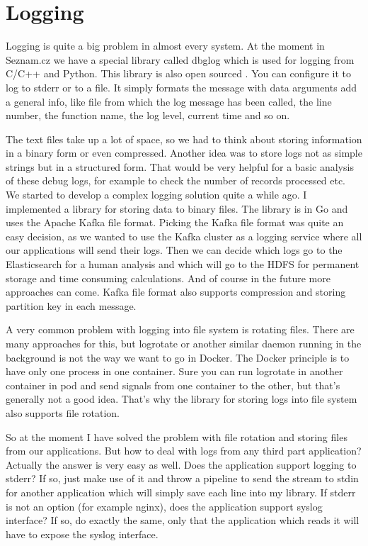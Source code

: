 \chapter{Logging}

Logging is quite a big problem in almost every system. At the moment in Seznam.cz we have a special library called dbglog which is used for logging from C/C++ and Python. This library is also open sourced \cite{dbglog}. You can configure it to log to stderr or to a file. It simply formats the message with data arguments add a general info, like file from which the log message has been called, the line number, the function name, the log level, current time and so on.

The text files take up a lot of space, so we had to think about storing information in a binary form or even compressed. Another idea was to store logs not as simple strings but in a structured form. That would be very helpful for a basic analysis of these debug logs, for example to check the number of records processed etc. We started to develop a complex logging solution quite a while ago. I implemented a library for storing data to binary files. The library is in Go and uses the Apache Kafka \cite{kafka} file format. Picking the Kafka file format was quite an easy decision, as we wanted to use the Kafka cluster as a logging service where all our applications will send their logs. Then we can decide which logs go to the Elasticsearch \cite{elasticsearch} for a human analysis and which will go to the HDFS \cite{hdfs} for permanent storage and time consuming calculations. And of course in the future more approaches can come. Kafka file format also supports compression and storing partition key in each message.

A very common problem with logging into file system is rotating files. There are many approaches for this, but logrotate or another similar daemon running in the background is not the way we want to go in Docker. The Docker principle is to have only one process in one container. Sure you can run logrotate in another container in pod and send signals from one container to the other, but that’s generally not a good idea. That’s why the library for storing logs into file system also supports file rotation.

So at the moment I have solved the problem with file rotation and storing files from our applications. But how to deal with logs from any third part application? Actually the answer is very easy as well. Does the application support logging to stderr? If so, just make use of it and throw a pipeline to send the stream to stdin for another application which will simply save each line into my library. If stderr is not an option (for example nginx), does the application support syslog interface? If so, do exactly the same, only that the application which reads it will have to expose the syslog interface.

